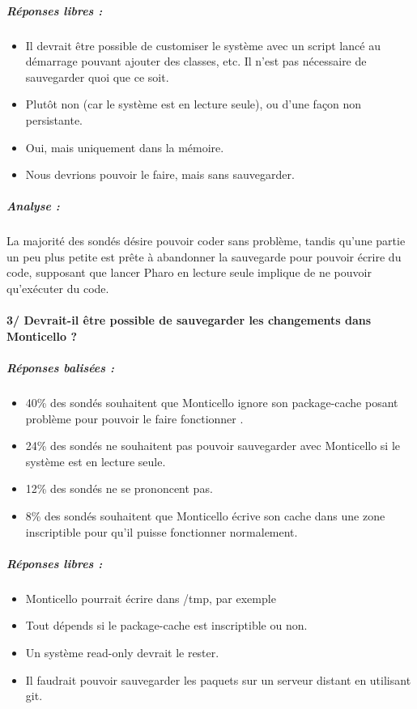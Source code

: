 \subparagraph{Réponses libres :}
\begin{itemize}
	\item Il devrait être possible de customiser le système avec un script lancé au démarrage pouvant ajouter des classes, etc. Il n'est pas nécessaire de sauvegarder quoi que ce soit.
	\item Plutôt non (car le système est en lecture seule), ou d'une façon non persistante.
	\item Oui, mais uniquement dans la mémoire.
	\item Nous devrions pouvoir le faire, mais sans sauvegarder.
\end{itemize}

\subparagraph{Analyse :}
La majorité des sondés désire pouvoir coder sans problème, tandis qu'une partie un peu plus petite est prête à abandonner la sauvegarde pour pouvoir écrire du code, supposant que lancer Pharo en lecture seule implique de ne pouvoir qu'exécuter du code.

\paragraph{3/ Devrait-il être possible de sauvegarder les changements dans Monticello ?}
\subparagraph{Réponses balisées :}
\begin{itemize}
	\item 40\% des sondés souhaitent que Monticello ignore son package-cache posant problème pour pouvoir le faire fonctionner .
	\item 24\% des sondés ne souhaitent pas pouvoir sauvegarder avec Monticello si le système est en lecture seule.
	\item 12\% des sondés ne se prononcent pas.
	\item 8\% des sondés souhaitent que Monticello écrive son cache dans une zone inscriptible pour qu'il puisse fonctionner normalement.
\end{itemize}

\subparagraph{Réponses libres :}
\begin{itemize}
	\item Monticello pourrait écrire dans /tmp, par exemple
	\item Tout dépends si le package-cache est inscriptible ou non.
	\item Un système read-only devrait le rester.
	\item Il faudrait pouvoir sauvegarder les paquets sur un serveur distant en utilisant git.
\end{itemize}

